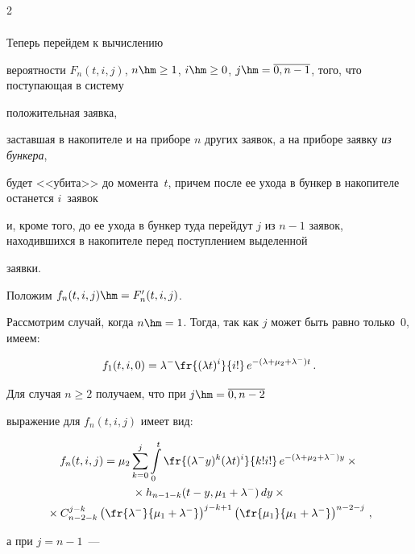 \begin{multicols}{2}
\begin{multline*}
\end{multline*}





Теперь перейдем к вычислению


вероятности $F_n(t,i,j)$, $n\hm\ge 1$, $i \hm\ge 0$, $j\hm=\overline{0,n-1}$, того, что поступающая в систему 


положительная заявка,


заставшая в накопителе и на приборе $n$ других заявок, а на приборе заявку \textit{из бункера},


будет <<убита>> до момента~$t$, причем после ее ухода в бункер в накопителе останется $i$~заявок


и, кроме того, до ее ухода в бункер туда перейдут $j$ из $n-1$ заявок, находившихся в накопителе перед поступлением выделенной


заявки.


Положим $f_n(t,i,j) \hm= F'_n(t,i,j)$.


Рассмотрим случай, когда $n\hm=1$. Тогда, так как $j$ может быть равно только~0, имеем:


$$ 


f_1(t,i,0) = \lambda^- \fr{(\lambda t)^i}{ i! }\, e^{-(\lambda+\mu_2 + \lambda^-) t}\,.


$$





Для случая $n \ge 2$ получаем, что при $j\hm=\overline{0,n-2}$


выражение для $f_n(t,i,j)$ имеет вид:


\begin{multline*}


f_n(t,i,j) = \mu_2 \sum\limits_{k=0}^{j} \int\limits_{0}^{t}


\fr{(\lambda^- y)^k (\lambda t)^i }{k! i!}\,


e^{-(\lambda+\mu_2+\lambda^-) y}\times{}\\


{}\times h_{n-1-k}(t-y,\mu_1+\lambda^-)\,dy


\times {}\\


{}\times C_{n-2-k}^{j-k} \left(\fr{\lambda^- }{\mu_1 + \lambda^-}\right)^{j-k+1}


          \left(\fr{\mu_1}{\mu_1 + \lambda^-}\right)^{n-2-j}\,,


\end{multline*}


а при $j=n-1$~---



\end{multicols}
